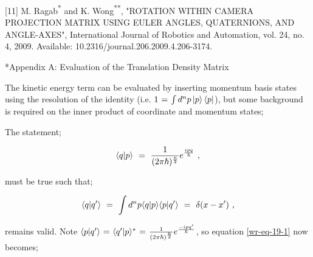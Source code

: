 \documentclass[11pt]{article}
\makeatletter
\let\workreportsection\section
\renewcommand{\section}{\@ifstar{\workreportstarsection}{\workreportsection}}
\newcommand{\workreportstarsection}[1]{\workreportsection*{#1}\addcontentsline{toc}{section}{#1}}
\makeatother
\begin{document}
[11] M. Ragab\textsuperscript{*} and K. Wong\textsuperscript{**}, "ROTATION WITHIN CAMERA PROJECTION MATRIX USING EULER ANGLES, QUATERNIONS, AND ANGLE-AXES", International Journal of Robotics and Automation, vol. 24, no. 4, 2009. Available: 10.2316/journal.206.2009.4.206-3174.












\hypertarget{wr-appendix-a}{}
\section*{Appendix A: Evaluation of the Translation Density Matrix}
\label{wr-app-firstappx-1}

The kinetic energy term can be evaluated by inserting momentum basis states using the resolution of the identity (i.e. \begin{math} 1 \hspace{0.025cm} = \hspace{0.025cm} \int d^n p \ket{p} \bra{p} \end{math}), but some background is required on the inner product of coordinate and momentum states;

The statement;

\begin{equation} \label{wr-eq-18-1}
\langle q | p \rangle \hspace{0.125cm} = \hspace{0.125cm} \frac{1}{(2 \pi \hbar)^{\frac{n}{2}}} e^{\frac{i p q}{\hbar}} \hspace{0.125cm} , 
\end{equation}

must be true such that;

\begin{equation} \label{wr-eq-19-1}
\langle q | q' \rangle \hspace{0.125cm} = \hspace{0.125cm} \int d^n p \langle q | p \rangle \langle p | q' \rangle \hspace{0.125cm} = \hspace{0.125cm} \delta ( x - x' )  \hspace{0.125cm} , 
\end{equation}

remains valid. Note \begin{math} \langle p | q' \rangle  \hspace{0.025cm} = \hspace{0.025cm} \langle q' | p \rangle^{*} \hspace{0.025cm} = \hspace{0.025cm} \frac{1}{(2 \pi \hbar)^{\frac{n}{2}}} e^{\frac{- i p q'}{\hbar}}  \end{math}, so  equation \ref{wr-eq-19-1} now becomes;
\end{document}
